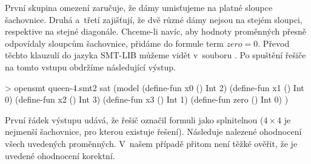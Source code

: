 \documentclass[12pt,a4paper]{report}
\let\openright=\clearpage
\begin{document}
První skupina omezení zaručuje, že dámy umisťujeme na platné sloupce šachovnice. Druhá a~třetí zajišťují, že dvě různé dámy nejsou na stejém sloupci, respektive na stejné diagonále. Chceme-li navíc, aby hodnoty proměnných přesně odpovídaly sloupcům šachovnice, přidáme do formule term $zero = 0$. Převod těchto klauzulí do jazyka SMT-LIB můžeme vidět v~souboru . Po spuštění řešiče na tomto vstupu obdržíme následující výstup.
\begin{code}
> opensmt queen-4.smt2
sat
(model
(define-fun x0 () Int 2)
(define-fun x1 () Int 0)
(define-fun x2 () Int 3)
(define-fun x3 () Int 1)
(define-fun zero () Int 0)
)
\end{code}
První řádek výstupu udává, že řešič označil formuli jako splnitelnou ($4\times4$ je nejmenší šachovnice, pro kterou existuje řešení). Následuje nalezené ohodnocení všech uvedených proměnných. V~našem případě přitom není těžké ověřit, že je uvedené ohodnocení korektní.

\openright
\end{document}
